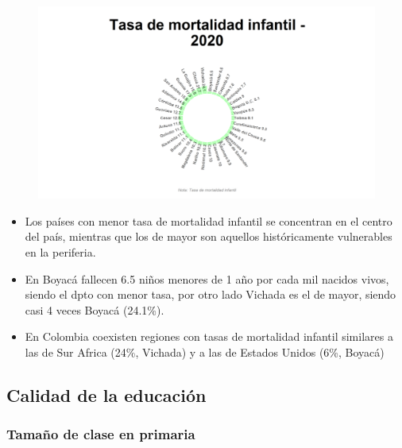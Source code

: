     \begin{figure}[H]
        \caption[Tasa de mortalidad infantil por departamentos para 2020 ]{\label{mortinf_dpto_static} }
        \begin{center}
        \includegraphics[width=\textwidth,keepaspectratio]{img/var_290_static.png}
        \end{center}
    \end{figure}
            \begin{itemize}
                    \item Los países con menor tasa de mortalidad infantil se concentran en el centro del país, mientras que los de mayor son aquellos históricamente vulnerables en la periferia.
                    \item En Boyacá fallecen 6.5 niños menores de 1 año por cada mil nacidos vivos, siendo el dpto con menor tasa, por otro lado Vichada es el de mayor, siendo casi 4 veces Boyacá (24.1\%).
                    \item En Colombia coexisten regiones con tasas de mortalidad infantil similares a las de Sur Africa (24\%, Vichada) y a las de Estados Unidos (6\%, Boyacá)
                    \end{itemize}






        
    \subsection{Calidad de la educación}
        \subsubsection{Tamaño de clase en primaria}

